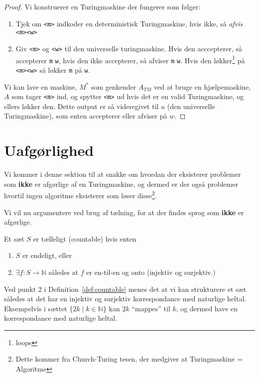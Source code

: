 \begin{proof}
	Vi konstruerer en Turingmaskine der fungerer som følger:
	\begin{enumerate}
		\item Tjek om \texttt{<m>} indkoder en deterministisk Turingmaskine, hvis ikke, så \textit{afvis} \texttt{<m><w>}
		\item Giv \texttt{<m>} og \texttt{<w>} til den universelle turingmaskine. Hvis den acccepterer, så accepterer \texttt{m} \texttt{w}, hvis den ikke accepterer, så afviser \texttt{m} \texttt{w}. Hvis den løkker\footnote{loops} på \texttt{<m><w>} så løkker \texttt{m} på \texttt{w}.
	\end{enumerate}

	Vi kan lave en maskine, $M^{*}$ som  genkender $A_{TM}$ ved at bruge en hjælpemaskine, $A$ som tager \texttt{<m>} ind, og spytter \texttt{<m>} ud hvis det er en valid Turingmaskine, og ellers løkker den. Dette output er så videregivet til $u$ (den universelle Turingmaskine), som enten accepterer eller afviser på $w$.

\end{proof}

\section{Uafgørlighed}%
\label{sec:undecidability}

Vi kommer i denne sektion til at snakke om hvordan der eksisterer problemer som \textbf{ikke} er afgørlige af en Turingmaskine, og dermed er der også problemer hvortil ingen algoritme eksisterer som løser disse\footnote{Dette kommer fra Church-Turing tesen, der medgiver at Turingmaskine = Algoritme}.

Vi vil nu argumentere ved brug af tælning, for at der findes sprog som \textbf{ikke} er afgørlige.

\begin{definition}
	\label{def:countable}
	Et sæt $S$ er tælleligt (countable) hvis enten
	\begin{enumerate}
		\item $S$ er endeligt, eller
		\item $\exists f : S \rightarrow \mathbb{N}$ således at $f$ er en-til-en og onto (injektiv og surjektiv.)
	\end{enumerate}
\end{definition}

Ved punkt 2 i Definition~\ref{def:countable} menes det at vi kan strukturere et sæt således at det har en injektiv og surjektiv korrespondance med naturlige heltal. Eksempelvis i sættet $\{2k \mid k \in \mathbb{N}\}$ kan $2k$ ``mappes'' til $k$, og dermed have en korrespondance med naturlige heltal.

